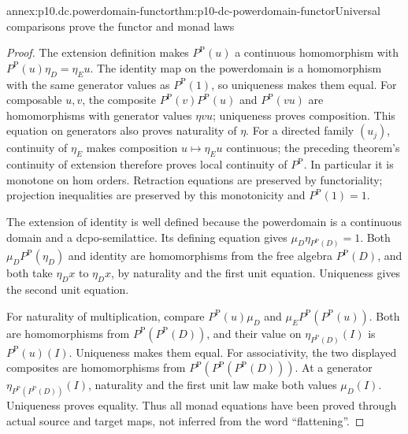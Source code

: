 \begin{annexitem}{annex:p10.dc.powerdomain-functor}{thm:p10-dc-powerdomain-functor}{Universal comparisons prove the functor and monad laws}
\begin{proof}
The extension definition makes \(P^{\mathrm P}(u)\) a continuous
homomorphism with \(P^{\mathrm P}(u)\eta_D=\eta_Eu\).
The identity map on the powerdomain is a homomorphism with the same
generator values as \(P^{\mathrm P}(1)\), so uniqueness makes them
equal. For composable \(u,v\), the composite
\(P^{\mathrm P}(v)P^{\mathrm P}(u)\) and
\(P^{\mathrm P}(vu)\) are homomorphisms with generator values
\(\eta vu\); uniqueness proves composition. This equation on generators
also proves naturality of \(\eta\).
For a directed family \((u_j)\), continuity of \(\eta_E\) makes
composition \(u\mapsto\eta_Eu\) continuous; the preceding theorem's
continuity of extension therefore proves local continuity of \(P^{\mathrm P}\).
In particular it is monotone on hom orders. Retraction equations are
preserved by functoriality; projection inequalities are preserved by this
monotonicity and \(P^{\mathrm P}(1)=1\).

The extension of identity is well defined because the powerdomain is a
continuous domain and a dcpo-semilattice. Its defining equation gives
\(\mu_D\eta_{P^{\mathrm P}(D)}=1\).
Both \(\mu_DP^{\mathrm P}(\eta_D)\) and identity are homomorphisms
from the free algebra \(P^{\mathrm P}(D)\), and both take \(\eta_Dx\)
to \(\eta_Dx\), by naturality and the first unit equation. Uniqueness
gives the second unit equation.

For naturality of multiplication, compare
\(P^{\mathrm P}(u)\mu_D\) and
\(\mu_EP^{\mathrm P}(P^{\mathrm P}(u))\). Both are homomorphisms
from \(P^{\mathrm P}(P^{\mathrm P}(D))\), and their value on
\(\eta_{P^{\mathrm P}(D)}(I)\) is \(P^{\mathrm P}(u)(I)\).
Uniqueness makes them equal.
For associativity, the two displayed composites are homomorphisms from
\(P^{\mathrm P}(P^{\mathrm P}(P^{\mathrm P}(D)))\).
At a generator \(\eta_{P^{\mathrm P}(P^{\mathrm P}(D))}(I)\),
naturality and the first unit law make both values \(\mu_D(I)\).
Uniqueness proves equality. Thus all monad equations have been proved
through actual source and target maps, not inferred from the word
``flattening''.
\end{proof}
\end{annexitem}

